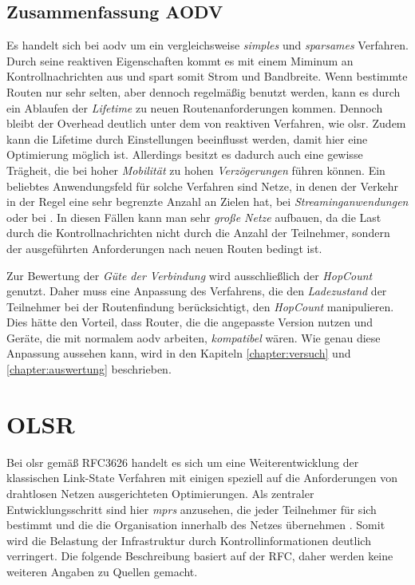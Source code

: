 \newpage 
\subsection{Zusammenfassung AODV}
\label{chapter:routing:aodv:summary}

Es handelt sich bei \gls{aodv} um ein vergleichsweise \textit{simples} und \textit{sparsames} Verfahren. Durch seine reaktiven Eigenschaften kommt es mit einem Miminum an Kontrollnachrichten aus und spart somit Strom und Bandbreite. Wenn bestimmte Routen nur sehr selten, aber dennoch regelmäßig benutzt werden, kann es durch ein Ablaufen der \textit{Lifetime} zu neuen Routenanforderungen kommen. Dennoch bleibt der Overhead deutlich unter dem von reaktiven Verfahren, wie \zB \gls{olsr}. Zudem kann die Lifetime durch Einstellungen beeinflusst werden, damit hier eine Optimierung möglich ist. Allerdings besitzt es dadurch auch eine gewisse Trägheit, die \zB bei hoher \textit{Mobilität} zu hohen \textit{Verzögerungen} führen können. Ein beliebtes Anwendungsfeld für solche Verfahren sind Netze, in denen der Verkehr in der Regel eine sehr begrenzte Anzahl an Zielen hat, \zB bei \textit{Streaminganwendungen} oder bei \textit{} \cite{Booranawong13}. In diesen Fällen kann man sehr \textit{große Netze} aufbauen, da die Last durch die Kontrollnachrichten nicht durch die Anzahl der Teilnehmer, sondern der ausgeführten Anforderungen nach neuen Routen bedingt ist.\newline

Zur Bewertung der \textit{Güte der Verbindung} wird ausschließlich der \textit{HopCount} genutzt. Daher muss eine Anpassung des Verfahrens, die den \textit{Ladezustand} der Teilnehmer bei der Routenfindung berücksichtigt, den \textit{HopCount} manipulieren. Dies hätte den Vorteil, dass Router, die die angepasste Version nutzen und Geräte, die mit normalem \gls{aodv} arbeiten, \textit{kompatibel} wären. Wie genau diese Anpassung aussehen kann, wird in den Kapiteln \ref{chapter:versuch} und \ref{chapter:auswertung} beschrieben.

\newpage 

\section{OLSR}
\label{chapter:routing:olsr}

Bei \acrlong{olsr} gemäß RFC3626 \cite{RFC3626} handelt es sich um eine Weiterentwicklung der klassischen Link-State Verfahren mit einigen speziell auf die Anforderungen von drahtlosen Netzen ausgerichteten Optimierungen. Als zentraler Entwicklungsschritt sind hier \textit{\glspl{mpr}} anzusehen, die jeder Teilnehmer für sich bestimmt und die die Organisation innerhalb des Netzes übernehmen \cite{Azzedine11}. Somit wird die Belastung der Infrastruktur durch Kontrollinformationen deutlich verringert. Die folgende Beschreibung basiert auf der RFC, daher werden keine weiteren Angaben zu Quellen gemacht.

